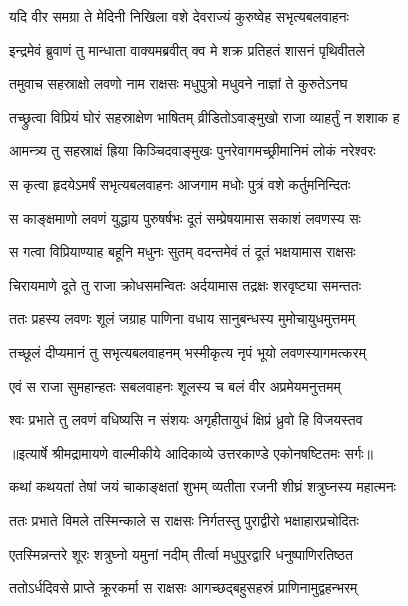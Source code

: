 \twolineshloka
{यदि वीर समग्रा ते मेदिनी निखिला वशे}
{देवराज्यं कुरुष्वेह सभृत्यबलवाहनः} %

\twolineshloka
{इन्द्रमेवं ब्रुवाणं तु मान्धाता वाक्यमब्रवीत्}
{क्व मे शक्र प्रतिहतं शासनं पृथिवीतले} %

\twolineshloka
{तमुवाच सहस्राक्षो लवणो नाम राक्षसः}
{मधुपुत्रो मधुवने नाज्ञां ते कुरुतेऽनघ} %

\twolineshloka
{तच्छ्रुत्वा विप्रियं घोरं सहस्राक्षेण भाषितम्}
{व्रीडितोऽवाङ्मुखो राजा व्याहर्तुं न शशाक ह} %

\twolineshloka
{आमन्त्र्य तु सहस्राक्षं ह्रिया किञ्चिदवाङ्मुखः}
{पुनरेवागमच्छ्रीमानिमं लोकं नरेश्वरः} %

\twolineshloka
{स कृत्वा हृदयेऽमर्षं सभृत्यबलवाहनः}
{आजगाम मधोः पुत्रं वशे कर्तुमनिन्दितः} %

\twolineshloka
{स काङ्क्षमाणो लवणं युद्धाय पुरुषर्षभः}
{दूतं सम्प्रेषयामास सकाशं लवणस्य सः} %

\twolineshloka
{स गत्वा विप्रियाण्याह बहूनि मधुनः सुतम्}
{वदन्तमेवं तं दूतं भक्षयामास राक्षसः} %

\twolineshloka
{चिरायमाणे दूते तु राजा क्रोधसमन्वितः}
{अर्दयामास तद्रक्षः शरवृष्ट्या समन्ततः} %

\twolineshloka
{ततः प्रहस्य लवणः शूलं जग्राह पाणिना}
{वधाय सानुबन्धस्य मुमोचायुधमुत्तमम्} %

\twolineshloka
{तच्छूलं दीप्यमानं तु सभृत्यबलवाहनम्}
{भस्मीकृत्य नृपं भूयो लवणस्यागमत्करम्} %

\twolineshloka
{एवं स राजा सुमहान्हतः सबलवाहनः}
{शूलस्य च बलं वीर अप्रमेयमनुत्तमम्} %

\twolineshloka
{श्वः प्रभाते तु लवणं वधिष्यसि न संशयः}
{अगृहीतायुधं क्षिप्रं ध्रुवो हि विजयस्तव} %


{॥इत्यार्षे श्रीमद्रामायणे वाल्मीकीये आदिकाव्ये उत्तरकाण्डे एकोनषष्टितमः सर्गः॥}


\twolineshloka
{कथां कथयतां तेषां जयं चाकाङ्क्षतां शुभम्}
{व्यतीता रजनी शीघ्रं शत्रुघ्नस्य महात्मनः} %

\twolineshloka
{ततः प्रभाते विमले तस्मिन्काले स राक्षसः}
{निर्गतस्तु पुराद्वीरो भक्षाहारप्रचोदितः} %

\twolineshloka
{एतस्मिन्नन्तरे शूरः शत्रुघ्नो यमुनां नदीम्}
{तीर्त्वा मधुपुरद्वारि धनुष्पाणिरतिष्ठत} %

\twolineshloka
{ततोऽर्धदिवसे प्राप्ते क्रूरकर्मा स राक्षसः}
{आगच्छद्बहुसहस्रं प्राणिनामुद्वहन्भरम्} %

